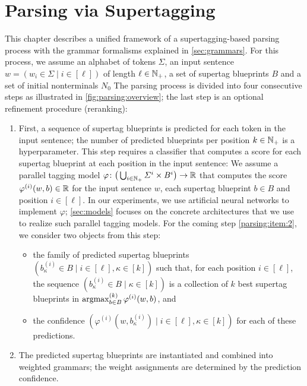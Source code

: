\documentclass[../document.tex]{subfiles}
\begin{document}
    \chapter{Parsing via Supertagging}\label{chp:parsing}
    This chapter describes a unified framework of a supertagging-based parsing process with the grammar formalisms explained in \cref{sec:grammars}.
    For this process, we assume an alphabet of tokens \(\varSigma\), an input sentence \(w = (w_i \in \varSigma \mid i \in [\ell])\) of length \(\ell \in \mathbb{N}_+\), a set of supertag blueprints \(B\) and a set of initial nonterminals \(N_0\)
    The parsing process is divided into four consecutive steps as illustrated in \cref{fig:parsing:overview}; the last step is an optional refinement procedure (reranking):
    \begin{enumerate}
        \item\label{parsing:item:1}
            First, a sequence of supertag blueprints is predicted for each token in the input sentence; the number of predicted blueprints per position \(k \in \mathbb{N}_+\) is a hyperparameter.
            This step requires a classifier that computes a score for each supertag blueprint at each position in the input sentence:
                We assume a parallel tagging model \(\varphi\colon \big(\bigcup_{i\in \mathbb{N}_+} \varSigma^i \times B^i \big) \to \mathbb{R}\) that computes the score \(\varphi^{(i)}(w, b) \in \mathbb{R}\) for the input sentence \(w\), each supertag blueprint \(b \in B\) and position \(i \in [\ell]\).
            In our experiments, we use artificial neural networks to implement \(\varphi\); \cref{sec:models} focuses on the concrete architectures that we use to realize such parallel tagging models.
            For the coming step \ref{parsing:item:2}, we consider two objects from this step:
            \begin{itemize}
                \item the family of predicted supertag blueprints \((b^{(i)}_{\kappa} \in B \mid i \in [\ell], \kappa \in [k])\) such that, for each position \(i\in [\ell]\), the sequence \((b^{(i)}_{\kappa} \in B \mid \kappa \in [k])\) is a collection of \(k\) best supertag blueprints in \(\operatorname{arg max}^{(k)}_{b \in B} \varphi^{(i)}(w, b)\), and
                \item the confidence \((\varphi^{(i)}(w, b^{(i)}_{\kappa}) \mid i \in [\ell], \kappa \in [k])\) for each of these predictions.
            \end{itemize}
        \item\label{parsing:item:2}
            The predicted supertag blueprints are instantiated and combined into weighted grammars; the weight assignments are determined by the prediction confidence.

\end{enumerate}
\end{document}
